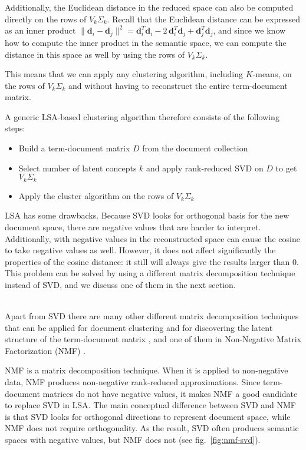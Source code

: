 Additionally, the Euclidean distance in the reduced space can also be computed
directly on the rows of $V_k \Sigma_k$. Recall that the Euclidean distance can
be expressed as an inner product
$\| \mathbf d_i - \mathbf d_j \|^2 = \mathbf d_i^T \mathbf d_i - 2 \, \mathbf d_i^T \mathbf d_j + \mathbf d_j^T \mathbf d_j$, and since we know how to compute the inner product
in the semantic space, we can compute the distance in this space as well
by using the rows of $V_k \Sigma_k$.

This means that we can apply any clustering algorithm,
including $K$-means, on the rows of $V_k \Sigma_k$ and without having
to reconstruct the entire term-document matrix.

A generic LSA-based clustering algorithm therefore consists of the following steps:

\begin{itemize}
\itemsep1pt\parskip0pt
  \item Build a term-document matrix $D$ from the document collection
  \item Select number of latent concepts $k$ and apply rank-reduced SVD on $D$ to get $V_k \Sigma_k$
  \item Apply the cluster algorithm on the rows of $V_k \Sigma_k$
\end{itemize}


LSA has some drawbacks. Because SVD looks for orthogonal basis
for the new document space, there are negative values that are harder
to interpret. Additionally, with negative values in the reconstructed
space can cause the cosine to take negative values as well.
However, it does not affect significantly the properties of the
cosine distance: it still will always give the results larger than 0.
This problem can be solved by using a different matrix decomposition
technique instead of SVD, and we discuss one of them in the next
section.


\ \\

Apart from SVD there are many other different matrix decomposition
techniques that can be applied for document clustering and for discovering
the latent structure of the term-document matrix \cite{osinski2006improving},
and one of them in Non-Negative Matrix Factorization (NMF) \cite{lee1999nnmf}.


NMF is a matrix decomposition technique. When it is applied to non-negative
data, NMF produces non-negative rank-reduced approximations.
Since term-document matrices do not have negative values, it makes
NMF a good candidate to replace SVD in LSA. The main conceptual difference
between SVD and NMF is that SVD looks for orthogonal directions to
represent document space, while NMF does not require orthogonality.
As the result, SVD often produces semantic spaces with negative values,
but NMF does not \cite{xu2003document} (see fig.~\ref{fig:nmf-svd}).


